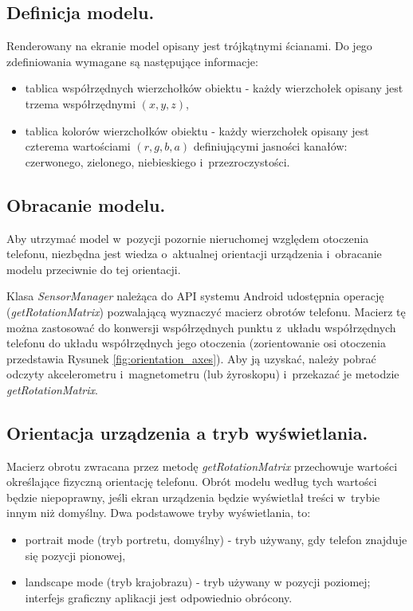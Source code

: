\documentclass[a4paper,twocolumn,11pt]{article}
\begin{document}
\subsection{Definicja modelu.}
 Renderowany na ekranie model opisany jest trójkątnymi ścianami.
 Do jego zdefiniowania wymagane są następujące informacje:

 \begin{itemize}
  \item tablica współrzędnych wierzchołków obiektu - każdy wierzchołek opisany jest trzema współrzędnymi $(x, y, z)$,
  \item tablica kolorów wierzchołków obiektu - każdy wierzchołek opisany jest czterema wartościami $(r, g, b, a)$ definiującymi jasności kanałów: czerwonego, zielonego, niebieskiego i~przezroczystości.
 \end{itemize}


\subsection{Obracanie modelu.}
 Aby utrzymać model w~pozycji pozornie nieruchomej względem otoczenia telefonu, niezbędna jest wiedza o~aktualnej orientacji urządzenia i~obracanie modelu przeciwnie do tej orientacji.
 
 Klasa \emph{SensorManager} należąca do API systemu Android udostępnia operację (\emph{getRotationMatrix}) pozwalającą wyznaczyć macierz obrotów telefonu.
 Macierz tę można zastosować do konwersji współrzędnych punktu z~układu współrzędnych telefonu do układu współrzędnych jego otoczenia (zorientowanie osi otoczenia przedstawia Rysunek \ref{fig:orientation_axes}).
 Aby ją uzyskać, należy pobrać odczyty akcelerometru i~magnetometru (lub żyroskopu) i~przekazać je metodzie \emph{getRotationMatrix}.

 


\subsection{Orientacja urządzenia a tryb wyświetlania.}
 Macierz obrotu zwracana przez metodę \emph{getRotationMatrix} przechowuje wartości określające fizyczną orientację telefonu.
 Obrót modelu według tych wartości będzie niepoprawny, jeśli ekran urządzenia będzie wyświetlał treści w~trybie innym niż domyślny.
 Dwa podstawowe tryby wyświetlania, to:
 \begin{itemize}
  \item portrait mode (tryb portretu, domyślny) - tryb używany, gdy telefon znajduje się pozycji pionowej,
  \item landscape mode (tryb krajobrazu) - tryb używany w pozycji poziomej; interfejs graficzny aplikacji jest odpowiednio obrócony.
 \end{itemize}
 
\end{document}
